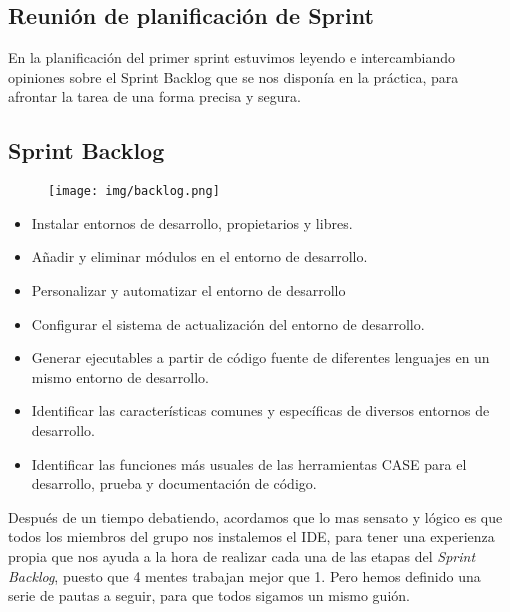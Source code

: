 \documentclass{article}
\begin{document}
      \subsection{Reunión de planificación de Sprint}
        En la planificación del primer sprint estuvimos leyendo e intercambiando opiniones sobre el Sprint Backlog que se nos disponía en la práctica, para afrontar la tarea de una forma 
        precisa y segura.
        \\
        \subsection{Sprint Backlog}
          \begin{figure}[h]
            \centering
            \texttt{[image: img/backlog.png]}
          \end{figure}
        
          \begin{itemize}
            \item Instalar entornos de desarrollo, propietarios y libres.
            \item Añadir y eliminar módulos en el entorno de desarrollo.
            \item Personalizar y automatizar el entorno de desarrollo
            \item Configurar el sistema de actualización del entorno de desarrollo.
            \item Generar ejecutables a partir de código fuente de diferentes lenguajes en un mismo entorno de desarrollo.
            \item Identificar las características comunes y específicas de diversos entornos de desarrollo.
            \item Identificar las funciones más usuales de las herramientas CASE para el desarrollo, prueba y documentación de código.
          \end{itemize}
        
        Después de un tiempo debatiendo, acordamos que lo mas sensato y lógico es que todos los miembros del grupo nos instalemos el IDE, para tener una experienza propia que nos ayuda a la hora
        de realizar cada una de las etapas del \textit{Sprint Backlog}, puesto que 4 mentes trabajan mejor que 1. Pero hemos definido una serie de pautas a seguir, para que todos sigamos un 
        mismo guión.
        \\
\end{document}

